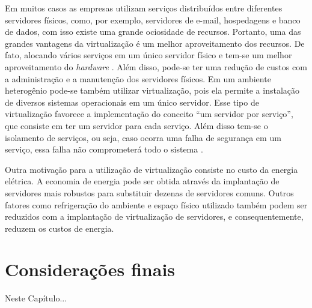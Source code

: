 Em muitos casos as empresas utilizam serviços distribuídos entre diferentes servidores físicos, como, por exemplo, servidores de e-mail, 
hospedagens e banco de dados, com isso existe uma grande ociosidade de recursos. Portanto, uma das grandes vantagens da virtualização é um melhor 
aproveitamento dos recursos. De fato, alocando vários serviços em um único servidor físico e tem-se um melhor aproveitamento do \textit{hardware} 
\cite{moreira2006}. Além disso, pode-se ter uma redução de custos com a administração e a manutenção dos servidores físicos. Em um ambiente 
heterogênio pode-se também utilizar virtualização, pois ela permite a instalação de diversos sistemas operacionais em um único servidor.
Esse tipo de virtualização favorece a implementação do conceito ``um servidor por serviço'', que consiste em ter um servidor para cada 
serviço. Além disso tem-se o isolamento de serviços, ou seja, caso ocorra uma falha de segurança em um serviço, essa falha não comprometerá 
todo o sistema \cite{carissimi2008}.

Outra motivação para a utilização de virtualização consiste no custo da energia elétrica. A economia de energia pode ser obtida 
através da implantação de servidores mais robustos para substituir dezenas de servidores comuns. Outros fatores como refrigeração do ambiente e 
espaço físico utilizado também podem ser reduzidos com a implantação de virtualização de servidores, e consequentemente, reduzem os 
custos de energia.

\section{Considerações finais}
Neste Capítulo...




